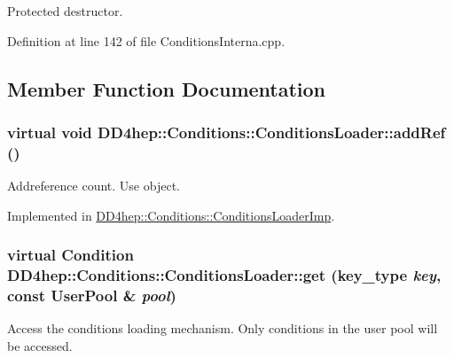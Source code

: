 Protected destructor. 

Definition at line 142 of file ConditionsInterna.cpp.

\subsection{Member Function Documentation}
\hypertarget{class_d_d4hep_1_1_conditions_1_1_conditions_loader_aec8e8abc8bbb54bf20f75c8197b8e71f}{
\subsubsection[{addRef}]{\setlength{\rightskip}{0pt plus 5cm}virtual void DD4hep::Conditions::ConditionsLoader::addRef ()}}
\label{class_d_d4hep_1_1_conditions_1_1_conditions_loader_aec8e8abc8bbb54bf20f75c8197b8e71f}


Addreference count. Use object. 

Implemented in \hyperlink{class_d_d4hep_1_1_conditions_1_1_conditions_loader_imp_a6302206e3ebcdf712425df5468598e2c}{DD4hep::Conditions::ConditionsLoaderImp}.\hypertarget{class_d_d4hep_1_1_conditions_1_1_conditions_loader_a9d8cacc0e3520074b386d157906a376f}{
\subsubsection[{get}]{\setlength{\rightskip}{0pt plus 5cm}virtual {\bf Condition} DD4hep::Conditions::ConditionsLoader::get ({\bf key\_\-type} {\em key}, \/  const {\bf UserPool} \& {\em pool})}}
\label{class_d_d4hep_1_1_conditions_1_1_conditions_loader_a9d8cacc0e3520074b386d157906a376f}


Access the conditions loading mechanism. Only conditions in the user pool will be accessed. 

